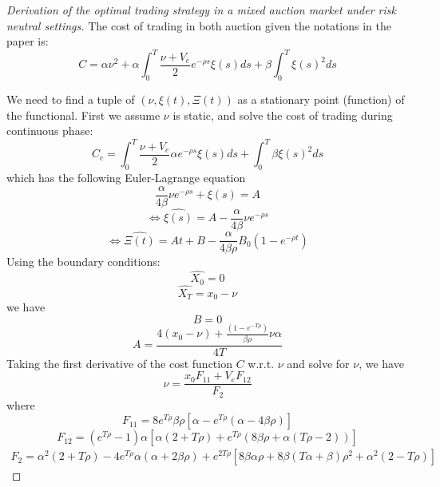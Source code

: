 
\begin{proof}[Derivation of the optimal trading strategy in a mixed auction market under risk neutral settings]\label{proof:optimal-strategy-mixed-auction}
    The cost of trading in both auction given the notations in the paper is:
    \[
      C = \alpha \nu^2  + \alpha \int_0^T \frac{\nu + V_e}{2} e^{-\rho s} \xi(s) ds + \beta \int_0^T \xi(s)^2 ds
    \]
  
    We need to find a tuple of $(\nu, \xi(t), \Xi(t))$ as a stationary point (function) of the functional. First we assume $\nu$ is static, and solve the cost of trading during continuous phase:
    \[
      C_c = \int_0^T \frac{\nu + V_e}{2} \alpha e^{-\rho s} \xi(s) ds + \int_0^T  \beta \xi(s)^2 ds
    \]
    which has the following Euler-Lagrange equation
    \[
      \frac{\alpha}{4 \beta} \nu  e^{-\rho s} +\xi(s) = A
    \]
    \[
      \Leftrightarrow \hat{\xi(s)} = A - \frac{\alpha}{4 \beta} \nu e^{-\rho s}
    \]
    \[
      \Leftrightarrow \hat{\Xi(t)} = At + B - \frac{\alpha}{4 \beta \rho}B_ 0 (1 - e^{-\rho t})
    \]
    Using the boundary conditions:
    \[
      \hat{X_0} = 0
    \]
    \[
      \hat{X_T} = x_0 - \nu
    \]
    we have
    \[
      B = 0
    \]
    \[
      A = \frac{4 (x_0 - \nu) + \frac{(1 - e^{-T \rho})}{\beta \rho} \nu \alpha} {4 T}
    \]
    Taking the first derivative of the cost function $C$ w.r.t. $\nu$ and solve for $\nu$, we have
    \[
      \nu = \frac{x_0 F_{11} + V_e F_{12}}{F_2}
    \]
    where
    \[
      F_{11} = 8 e^{T \rho} \beta \rho [\alpha - e^{T \rho} (\alpha - 4 \beta \rho)]
    \]
    \[
      F_{12} = (e^{T \rho}-1) \alpha [\alpha (2+T \rho) + e^{T \rho} (8 \beta \rho + \alpha (T \rho - 2 ))]
    \]
    \[
      \begin{split}
        F_2 = \alpha^2 (2 + T \rho) - 4 e^{T \rho} \alpha (\alpha + 2 \beta \rho)
        + e^{2 T \rho} [8 \beta \alpha \rho + 8 \beta (T \alpha + \beta) \rho^2 + \alpha^2 (2 - T \rho)]
      \end{split}
    \]
  
  \end{proof}